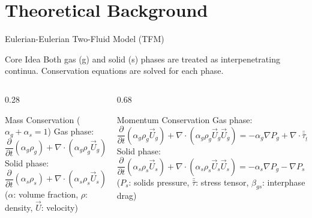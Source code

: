 \documentclass[aspectratio=169]{beamer} %
\begin{document}
\section{Theoretical Background}
\begin{frame}{Eulerian-Eulerian Two-Fluid Model (TFM)}
    \begin{block}{Core Idea}
        Both gas (g) and solid (s) phases are treated as interpenetrating continua.
        Conservation equations are solved for each phase.
    \end{block}
    \vspace{-1.2em}
    \begin{columns}[T]
        \begin{column}{0.28\textwidth}
            \begin{block}{ \scriptsize Mass Conservation ($\alpha_g + \alpha_s = 1$)}
                Gas phase:
                \small
                \[ \frac{\partial}{\partial t}(\alpha_g \rho_g) + \nabla \cdot (\alpha_g \rho_g \vec{U}_g) = 0 \]
                Solid phase:
                \[ \frac{\partial}{\partial t}(\alpha_s \rho_s) + \nabla \cdot (\alpha_s \rho_s \vec{U}_s) = 0 \]
                {\tiny ($\alpha$: volume fraction, $\rho$: density, $\vec{U}$: velocity)}
            \end{block}
        \end{column}
        \begin{column}{0.68\textwidth}
            \begin{block}{\scriptsize Momentum Conservation }
                Gas phase:
                { \scriptsize
                \[ \frac{\partial}{\partial t}(\alpha_g \rho_g \vec{U}_g) + \nabla \cdot (\alpha_g \rho_g \vec{U}_g \vec{U}_g) = -\alpha_g \nabla P_g + \nabla \cdot \bar{\bar{\tau}}_g + \alpha_g \rho_g \vec{g} - \beta_{gs}(\vec{U}_g - \vec{U}_s) \] }
                Solid phase:
                {\scriptsize
                \[ \frac{\partial}{\partial t}(\alpha_s \rho_s \vec{U}_s) +  \nabla \cdot (\alpha_s \rho_s \vec{U}_s \vec{U}_s) = -\alpha_s \nabla P_g - \nabla P_s + \nabla \cdot \bar{\bar{\tau}}_s + \alpha_s \rho_s \vec{g} + \beta_{gs}(\vec{U}_g - \vec{U}_s) \]
                }
                \normalsize
                ($P_s$: solids pressure, $\bar{\bar{\tau}}$: stress tensor, $\beta_{gs}$: interphase drag)
            \end{block}
        \end{column}
    \end{columns}
\end{frame}
\end{document}
